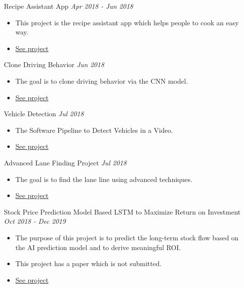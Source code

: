 \documentclass[10pt]{article}
\newenvironment{changemargin}[2]{
  \begin{list}{}{
    \setlength{\topsep}{0pt}
    \setlength{\leftmargin}{#1}
    \setlength{\rightmargin}{#2}
    \setlength{\listparindent}{\parindent}
    \setlength{\itemindent}{\parindent}
    \setlength{\parsep}{\parskip}
  }
  \item[]}{\end{list}
}
\newcommand{\project}[2]{
	{#1} \hfill \emph{#2}\\ \medskip
}
\newenvironment{body} {
	\vspace*{-16pt}
	\begin{changemargin}{-0.25in}{-0.5in}
  }
	{\end{changemargin}
}
\begin{document}
\begin{body}
\project{Recipe Assistant App}{Apr 2018 - Jun 2018}
\begin{itemize} \itemsep -0pt  %
      \item  This project is the recipe assistant app which helps people to cook an easy way.
      \item \href{https://github.com/jeongwhanchoi/recipe-assistant-app}{See project}
  	\end{itemize}
	
		
\project{Clone Driving  Behavior}{Jun 2018}
\begin{itemize} \itemsep -0pt  %
      \item  The goal is to clone driving behavior via the CNN model.
      \item \href{https://github.com/jeongwhanchoi/CarND-Behavioral-Cloning}{See project}
  	\end{itemize}
	
\project{Vehicle Detection}{Jul 2018}
\begin{itemize} \itemsep -0pt  %
      \item  The Software Pipeline to Detect Vehicles in a Video.
      \item \href{https://github.com/jeongwhanchoi/CarND-Vehicle-Detection}{See project}
  	\end{itemize}
	
\project{Advanced Lane Finding Project}{Jul 2018}
\begin{itemize} \itemsep -0pt  %
      \item  The goal is to find the lane line using advanced techniques.
      \item \href{https://github.com/jeongwhanchoi/CarND-Advanced-Lane-Lines}{See project}
  	\end{itemize}
	
\project{Stock Price Prediction Model Based LSTM to Maximize Return on Investment}{Oct 2018 - Dec 2019}
\begin{itemize} \itemsep -0pt  %
      \item  The purpose of this project is to predict the long-term stock flow based on the AI prediction model and to derive meaningful ROI.
      \item This project has a paper which is not submitted.
      \item \href{https://drive.google.com/file/d/1Fp3WmoBpHpYU13fNWS1vbQSzmBCR3MIu/view}{See project}
  	\end{itemize}
	

\end{body}
\end{document}
